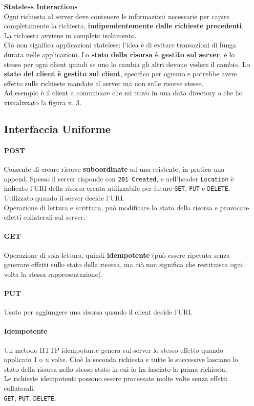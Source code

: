 \documentclass[10pt]{article}
\begin{document}
\begin{list}{}{}
	\item \textbf{Stateless Interactions}\\
	Ogni richiesta al server deve contenere le informazioni necessarie per capire completamente la richiesta, \textbf{indipendentemente dalle richieste precedenti}. La richiesta avviene in completo isolamento.\\
	Ciò non significa applicazioni stateless: l'idea è di evitare transazioni di lunga durata nelle applicazioni. Lo \textbf{stato della risorsa è gestito sul server}, è lo stesso per ogni client quindi se uno lo cambia gli altri devono vedere il cambio. Lo \textbf{stato del client è gestito sul client}, specifico per ognuno e potrebbe avere effetto sulle richieste mandate al server ma non sulle risorse stesse.\\
	Ad esempio è il client a comunicare che mi trovo in una data directory o che ho visualizzato la figura n. 3.
\end{list}
\subsection{Interfaccia Uniforme}
\paragraph{POST} Consente di creare risorse \textbf{suboordinate} ad una esistente, in pratica una append. Spesso il server risponde con \texttt{201 Created}, e nell'header \texttt{Location} è indicato l'URI della risorsa creata utilizzabile per future \texttt{GET}, \texttt{PUT} e \texttt{DELETE}.\\
Utilizzato quando il server decide l'URI.\\
Operazione di lettura e scrittura, può modificare lo stato della risorsa e provocare effetti collaterali sul server.
\paragraph{GET} Operazione di sola lettura, quindi \textbf{idempotente} (può essere ripetuta senza generare effetti sullo stato della risorsa, ma ciò non significa che restituisca ogni volta la stessa rappresentazione).
\paragraph{PUT} Usato per aggiungere una risorsa quando il client decide l'URI.
\paragraph{Idempotente} Un metodo HTTP idempotante genera sul server lo stesso effetto quando applicato 1 o \textit{n} volte. Cioè la seconda richiesta e tutte le successive lasciano lo stato della risorsa nello stesso stato in cui lo ha lasciato la prima richiesta.\\
Le richieste idempotenti possono essere processate molte volte senza effetti collaterali.\\
\texttt{GET}, \texttt{PUT}, \texttt{DELETE}.
\end{document}
